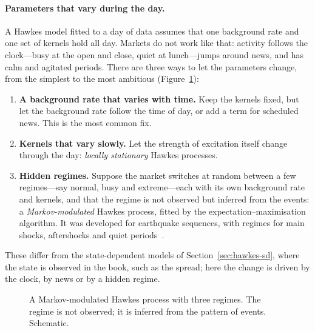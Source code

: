 \paragraph{Parameters that vary during the day.} A Hawkes model fitted to a day of data assumes that one background rate and one set of
kernels hold all day. Markets do not work like that: activity follows the clock---busy at the open and close,
quiet at lunch---jumps around news, and has calm and agitated periods. There are three ways to let the parameters
change, from the simplest to the most ambitious (Figure~\ref{fig:hawkes-regimes}):
\begin{enumerate}[leftmargin=1.8em,itemsep=2pt]
\item \textbf{A background rate that varies with time.} Keep the kernels fixed, but let the background rate
  follow the time of day, or add a term for scheduled news. This is the most common fix.
\item \textbf{Kernels that vary slowly.} Let the strength of excitation itself change through the day:
  \emph{locally stationary} Hawkes processes.
\item \textbf{Hidden regimes.} Suppose the market switches at random between a few regimes---say normal, busy and
  extreme---each with its own background rate and kernels, and that the regime is not observed but inferred from
  the events: a \emph{Markov-modulated} Hawkes process, fitted by the expectation--maximisation algorithm. It was
  developed for earthquake sequences, with regimes for main shocks, aftershocks and quiet
  periods~\citep{wang2012mmhp}.
\end{enumerate}
These differ from the state-dependent models of Section~\ref{sec:hawkes-sd}, where the state is observed in the
book, such as the spread; here the change is driven by the clock, by news or by a hidden regime.

\begin{figure}[!htbp]
\centering
{}
\caption{A Markov-modulated Hawkes process with three regimes. The regime is not observed; it is inferred from
the pattern of events. Schematic.}
\label{fig:hawkes-regimes}
\end{figure}

